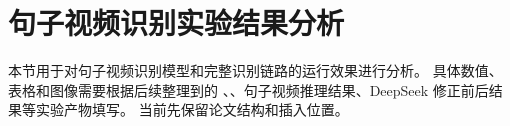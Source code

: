 \section{句子视频识别实验结果分析}

本节用于对句子视频识别模型和完整识别链路的运行效果进行分析。
具体数值、表格和图像需要根据后续整理到的 、、句子视频推理结果、DeepSeek 修正前后结果等实验产物填写。
当前先保留论文结构和插入位置。





